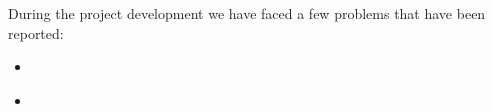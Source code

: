 \documentclass[11pt,a4paper]{article}
\begin{document}
During the project development we have faced a few problems that have been reported:
\begin{itemize}
    \item \href{https://github.com/IBM-Bluemix-Docs/ContinuousDelivery/issues/13}{}
    \item \href{https://github.com/IBM-Cloud/aspnet-core-helloworld/issues/39}{\color{urlColor}{github.com/IBM-Cloud/aspnet-core-helloworld/issues/39}}
\end{itemize}
\end{document}
